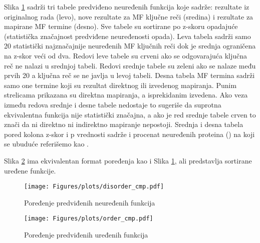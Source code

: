 Slika \ref{fig:disorder_cmp} sadrži tri tabele predviđeno neuređenih funkcija
koje sadrže: rezultate iz originalnog rada \cite{Xie2007} (levo), nove
rezultate za MF ključne reči (sredina) i rezultate za mapirane MF termine
(desno). Sve tabele su sortirane po z-skoru opadajuće (statistička značajnost
predviđene neuređenosti opada).  Leva tabela sadrži samo 20 statistički najznačajnije
neuređenih MF ključnih reči dok je srednja ograničena na z-skor veći od dva.
Redovi leve tabele su crveni ako se odgovarajuća ključna reč ne nalazi u
srednjoj tabeli.  Redovi srednje tabele su zeleni ako se nalaze među prvih 20 a
ključna reč se ne javlja u levoj tabeli.  Desna tabela MF termina sadrži samo
one termine koji su rezultat direktnog ili izvedenog mapiranja.  Punim
strelicama prikazana su direktna mapiranja, a isprekidanim izvedena.  Ako veza
između redova srednje i desne tabele nedostaje to sugeriše da suprotna
ekvivalentna funkcija nije statistički značajna, a ako je red srednje tabele
crven to znači da ni direktno ni indirektno mapiranje nepostoji.  Srednja i
desna tabela pored kolona z-skor i p vrednosti sadrže i procenat neuređenih
proteina () na koji se ubuduće referišemo kao
.  

Slika \ref{fig:order_cmp} ima ekvivalentan format poređenja kao i Slika
\ref{fig:disorder_cmp}, ali predstavlja sortirane uređene funkcije.



\clearpage

\begin{figure}[th]
\hspace*{-2.5cm} 
\texttt{[image: Figures/plots/disorder\_cmp.pdf]}
\decoRule
\caption {
  Poređenje predviđenih neuređenih funkcija
}
\label{fig:disorder_cmp}
\end{figure}

\begin{figure}[th]
\hspace*{-2.0cm} 
\texttt{[image: Figures/plots/order\_cmp.pdf]}
\decoRule
\caption {
  Poređenje predviđenih uređenih funkcija
}
\label{fig:order_cmp}
\end{figure}


\clearpage

